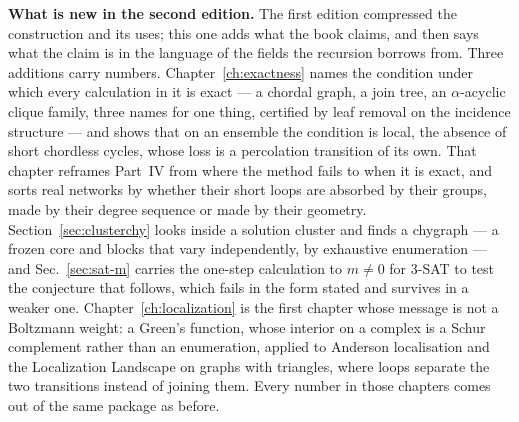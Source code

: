 \medskip
\noindent\textbf{What is new in the second edition.} The first edition
compressed the construction and its uses; this one adds what the book
claims, and then says what the claim is in the language of the fields the
recursion borrows from. Three additions carry numbers.
Chapter~\ref{ch:exactness} names the condition under which every
calculation in it is exact --- a chordal graph, a join tree, an
$\alpha$-acyclic clique family, three names for one thing, certified by
leaf removal on the incidence structure --- and shows that on an ensemble
the condition is local, the absence of short chordless cycles, whose loss
is a percolation transition of its own. That chapter reframes Part~IV from
where the method fails to when it is exact, and sorts real networks by
whether their short loops are absorbed by their groups, made by their
degree sequence or made by their geometry. Section~\ref{sec:clusterchy}
looks inside a solution cluster and finds a chygraph --- a frozen core and
blocks that vary independently, by exhaustive enumeration --- and
Sec.~\ref{sec:sat-m} carries the one-step calculation to $m\ne0$ for
$3$-SAT to test the conjecture that follows, which fails in the form
stated and survives in a weaker one. Chapter~\ref{ch:localization} is the
first chapter whose message is not a Boltzmann weight: a Green's function,
whose interior on a complex is a Schur complement rather than an
enumeration, applied to Anderson localisation and the Localization
Landscape on graphs with triangles, where loops separate the two
transitions instead of joining them. Every number in those chapters comes
out of the same package as before.

